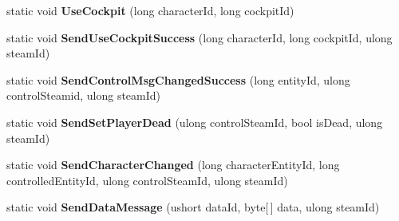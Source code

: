 \begin{DoxyCompactItemize}
\item 
\hypertarget{class_s_e_mod_a_p_i_internal_1_1_a_p_i_1_1_server_1_1_server_network_manager_a933cb66db9d493d0156315e043409cb2}{}static void {\bfseries Use\+Cockpit} (long character\+Id, long cockpit\+Id)\label{class_s_e_mod_a_p_i_internal_1_1_a_p_i_1_1_server_1_1_server_network_manager_a933cb66db9d493d0156315e043409cb2}

\item 
\hypertarget{class_s_e_mod_a_p_i_internal_1_1_a_p_i_1_1_server_1_1_server_network_manager_a087f37e98df8e99bda027a5df7013077}{}static void {\bfseries Send\+Use\+Cockpit\+Success} (long character\+Id, long cockpit\+Id, ulong steam\+Id)\label{class_s_e_mod_a_p_i_internal_1_1_a_p_i_1_1_server_1_1_server_network_manager_a087f37e98df8e99bda027a5df7013077}

\item 
\hypertarget{class_s_e_mod_a_p_i_internal_1_1_a_p_i_1_1_server_1_1_server_network_manager_a580876116631b3012431a91553d3e93b}{}static void {\bfseries Send\+Control\+Msg\+Changed\+Success} (long entity\+Id, ulong control\+Steamid, ulong steam\+Id)\label{class_s_e_mod_a_p_i_internal_1_1_a_p_i_1_1_server_1_1_server_network_manager_a580876116631b3012431a91553d3e93b}

\item 
\hypertarget{class_s_e_mod_a_p_i_internal_1_1_a_p_i_1_1_server_1_1_server_network_manager_accc86113f657239e8e005dfeff048fad}{}static void {\bfseries Send\+Set\+Player\+Dead} (ulong control\+Steam\+Id, bool is\+Dead, ulong steam\+Id)\label{class_s_e_mod_a_p_i_internal_1_1_a_p_i_1_1_server_1_1_server_network_manager_accc86113f657239e8e005dfeff048fad}

\item 
\hypertarget{class_s_e_mod_a_p_i_internal_1_1_a_p_i_1_1_server_1_1_server_network_manager_a4f255baf23d6aeaf279627c28da98a6c}{}static void {\bfseries Send\+Character\+Changed} (long character\+Entity\+Id, long controlled\+Entity\+Id, ulong control\+Steam\+Id, ulong steam\+Id)\label{class_s_e_mod_a_p_i_internal_1_1_a_p_i_1_1_server_1_1_server_network_manager_a4f255baf23d6aeaf279627c28da98a6c}

\item 
\hypertarget{class_s_e_mod_a_p_i_internal_1_1_a_p_i_1_1_server_1_1_server_network_manager_a0d9fa78497d4ad4a218f6fa079597ec9}{}static void {\bfseries Send\+Data\+Message} (ushort data\+Id, byte\mbox{[}$\,$\mbox{]} data, ulong steam\+Id)\label{class_s_e_mod_a_p_i_internal_1_1_a_p_i_1_1_server_1_1_server_network_manager_a0d9fa78497d4ad4a218f6fa079597ec9}

\end{DoxyCompactItemize}
